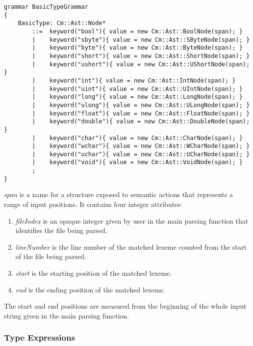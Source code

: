 \documentclass[a4paper,oneside,11pt]{book}
\theoremstyle{definition}
\begin{document}
\lstset{language=cmpg}
\begin{lstlisting}
grammar BasicTypeGrammar
{
    BasicType: Cm::Ast::Node*
        ::=  keyword("bool"){ value = new Cm::Ast::BoolNode(span); }
        |    keyword("sbyte"){ value = new Cm::Ast::SByteNode(span); }
        |    keyword("byte"){ value = new Cm::Ast::ByteNode(span); }
        |    keyword("short"){ value = new Cm::Ast::ShortNode(span); }
        |    keyword("ushort"){ value = new Cm::Ast::UShortNode(span); }
        |    keyword("int"){ value = new Cm::Ast::IntNode(span); }
        |    keyword("uint"){ value = new Cm::Ast::UIntNode(span); }
        |    keyword("long"){ value = new Cm::Ast::LongNode(span); }
        |    keyword("ulong"){ value = new Cm::Ast::ULongNode(span); }
        |    keyword("float"){ value = new Cm::Ast::FloatNode(span); }
        |    keyword("double"){ value = new Cm::Ast::DoubleNode(span); }
        |    keyword("char"){ value = new Cm::Ast::CharNode(span); }
        |    keyword("wchar"){ value = new Cm::Ast::WCharNode(span); }
        |    keyword("uchar"){ value = new Cm::Ast::UCharNode(span); }
        |    keyword("void"){ value = new Cm::Ast::VoidNode(span); }
        ;
}
\end{lstlisting}

\begin{flushleft}
\emph{span} is a name for a structure exposed to semantic actions that represents a range of input positions.
It contains four integer attributes:
\begin{enumerate}
\item
\emph{fileIndex} is an opaque integer given by user in the main parsing function that identifies the file being parsed.
\item
\emph{lineNumber} is the line number of the matched lexeme counted from the start of the file being parsed.
\item
\emph{start} is the starting position of the matched lexeme.
\item
\emph{end} is the ending position of the matched lexeme.
\end{enumerate}

The start and end positions are measured from the beginning of the whole input string given in the main parsing function.
\end{flushleft}

\subsubsection{Type Expressions}
\end{document}
